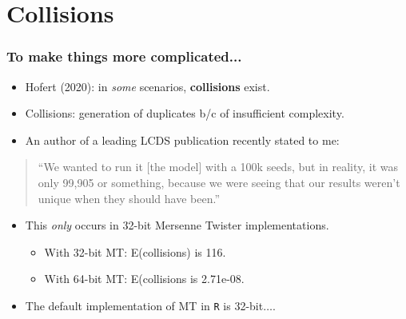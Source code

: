 \documentclass[12pt]{beamer}
\begin{document}
\section{Collisions}
\begin{frame}
\begin{small}
\frametitle{To make things more complicated...}
\begin{itemize}
\item Hofert (2020): in \textit{some} scenarios, \textbf{collisions} exist.\\ \vspace{.01in}
\item Collisions: generation of duplicates b/c of insufficient complexity.\\ \vspace{.01in}
\item An author of a leading LCDS publication recently  stated to me:\\ \vspace{.01in}
\end{itemize}
\begin{quote}
\begin{small}
\begin{center}
``We wanted to run it [the model] with a 100k seeds, but in reality, it was only 99,905 or something, because we were seeing that our results weren't unique when they should have been.''
\end{center}
\end{small}
\end{quote}
\begin{itemize}
\item This \textit{only} occurs in 32-bit Mersenne Twister implementations.\\ \vspace{.01in}
\begin{itemize}
\item With 32-bit MT: E(collisions) is 116.\\ \vspace{.01in}
\item With 64-bit MT: E(collisions is 2.71e-08.\\ \vspace{.01in}
\end{itemize}
\item The default implementation of MT in \texttt{R} is 32-bit$\hdots$.
\end{itemize}
\end{small}
\end{frame}
\end{document}
